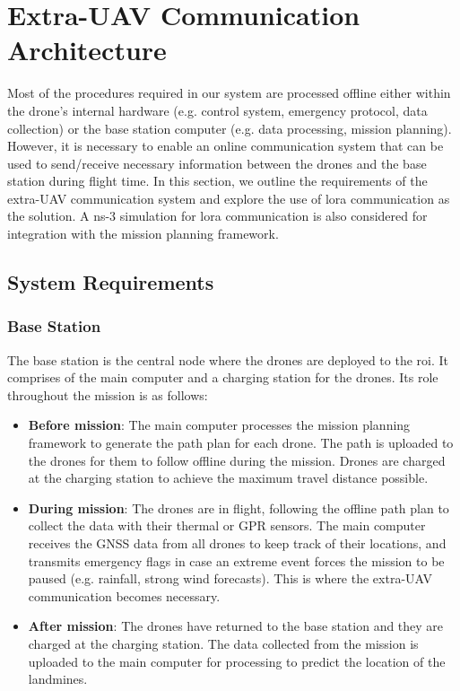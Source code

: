 \newpage
{}
\section{Extra-UAV Communication Architecture} \label{sec:euc}

Most of the procedures required in our system are processed offline either within the drone's internal hardware (e.g. control system, emergency protocol, data collection) or the base station computer (e.g. data processing, mission planning). However, it is necessary to enable an online communication system that can be used to send/receive necessary information between the drones and the base station during flight time. In this section, we outline the requirements of the extra-\gls{UAV} communication system and explore the use of \gls{lora} communication as the solution. A ns-3 simulation for \gls{lora} communication is also considered for integration with the mission planning framework. 

\subsection{System Requirements}
\label{sec:euc_requirements}

\subsubsection{Base Station}

The base station is the central node where the drones are deployed to the \gls{roi}. It comprises of the main computer and a charging station for the drones. Its role throughout the mission is as follows:

\begin{itemize}
    \item \textbf{Before mission}: The main computer processes the mission planning framework to generate the path plan for each drone. The path is uploaded to the drones for them to follow offline during the mission. Drones are charged at the charging station to achieve the maximum travel distance possible. 
    \item \textbf{During mission}: The drones are in flight, following the offline path plan to collect the data with their thermal or \gls{GPR} sensors. The main computer receives the \gls{GNSS} data from all drones to keep track of their locations, and transmits emergency flags in case an extreme event forces the mission to be paused (e.g. rainfall, strong wind forecasts). This is where the extra-\gls{UAV} communication becomes necessary. 
    \item \textbf{After mission}: The drones have returned to the base station and they are charged at the charging station. The data collected from the mission is uploaded to the main computer for processing to predict the location of the landmines. 
\end{itemize}

